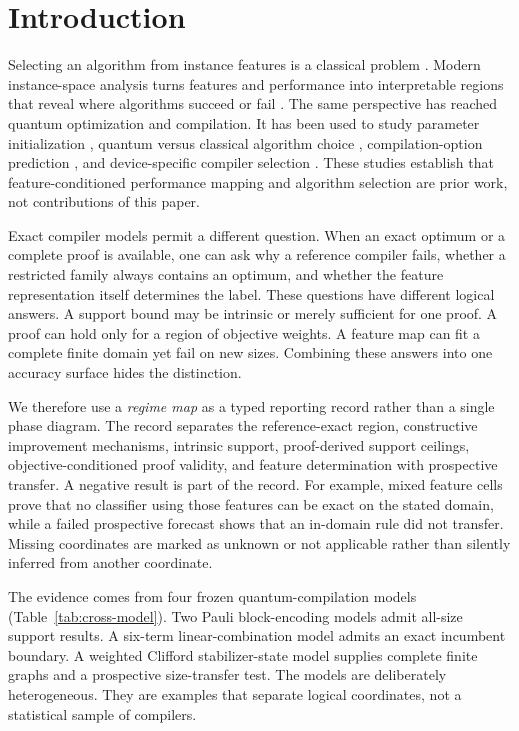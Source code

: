 \section{Introduction}

Selecting an algorithm from instance features is a classical problem \cite{rice1976algorithm}.  Modern instance-space analysis turns features and performance into interpretable regions that reveal where algorithms succeed or fail \cite{smithmiles2009meta,smithmiles2023isa}.  The same perspective has reached quantum optimization and compilation.  It has been used to study parameter initialization \cite{katial2025qaoa}, quantum versus classical algorithm choice \cite{moussa2020selection}, compilation-option prediction \cite{quetschlich2023options}, and device-specific compiler selection \cite{quetschlich2025predictor}.  These studies establish that feature-conditioned performance mapping and algorithm selection are prior work, not contributions of this paper.

Exact compiler models permit a different question.  When an exact optimum or a complete proof is available, one can ask why a reference compiler fails, whether a restricted family always contains an optimum, and whether the feature representation itself determines the label.  These questions have different logical answers.  A support bound may be intrinsic or merely sufficient for one proof.  A proof can hold only for a region of objective weights.  A feature map can fit a complete finite domain yet fail on new sizes.  Combining these answers into one accuracy surface hides the distinction.

We therefore use a \emph{regime map} as a typed reporting record rather than a single phase diagram.  The record separates the reference-exact region, constructive improvement mechanisms, intrinsic support, proof-derived support ceilings, objective-conditioned proof validity, and feature determination with prospective transfer.  A negative result is part of the record.  For example, mixed feature cells prove that no classifier using those features can be exact on the stated domain, while a failed prospective forecast shows that an in-domain rule did not transfer.  Missing coordinates are marked as unknown or not applicable rather than silently inferred from another coordinate.

The evidence comes from four frozen quantum-compilation models (Table~\ref{tab:cross-model}).  Two Pauli block-encoding models admit all-size support results.  A six-term linear-combination model admits an exact incumbent boundary.  A weighted Clifford stabilizer-state model supplies complete finite graphs and a prospective size-transfer test.  The models are deliberately heterogeneous.  They are examples that separate logical coordinates, not a statistical sample of compilers.

